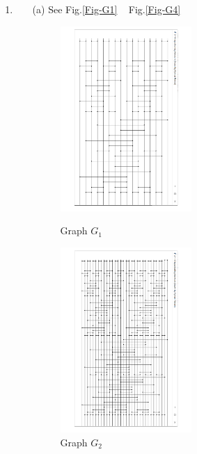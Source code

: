 \documentclass[12pt,a4paper]{article}
\makeatletter
\newtheorem*{solution}{Solution}
\theoremstyle{definition}
\renewenvironment{solution}[1][Solution] {\par\pushQED{\qed}\normalfont\topsep6\p@\@plus6\p@\relax\trivlist\item[\hskip\labelsep\bfseries#1\@addpunct{.}]\ignorespaces}{\popQED\endtrivlist\@endpefalse} \makeatother
\makeatother
\begin{document}
\begin{enumerate}
\begin{enumerate}
    \end{enumerate}
	\begin{solution}
		\begin{enumerate}
			\item[(a)] See Fig.\ref{Fig-G1} ~ Fig.\ref{Fig-G4}
			\begin{figure}[htbp]
				\begin{minipage}[h]{0.45\textwidth}
					\centering
					\includegraphics[width=0.5\textwidth,angle=90]{2_8.pdf}
					\caption{Graph $G_1$} \label{Fig-G1}
				\end{minipage}
				\hspace{5mm}
				\begin{minipage}[h]{0.45\textwidth}
					\centering
					\includegraphics[width=0.5\textwidth,angle=90]{2_16.pdf}
					\caption{Graph $G_2$} \label{Fig-G2}

\end{minipage}
\end{figure}
\end{enumerate}
\end{solution}
\end{enumerate}
\end{document}
